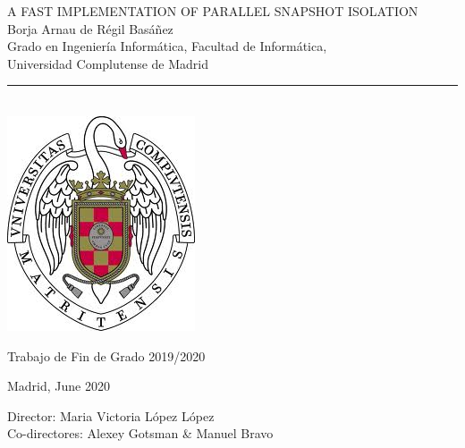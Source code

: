 \newpage
\thispagestyle{empty}
\begin{center}
   \vspace{1cm}
   {\Large A FAST IMPLEMENTATION OF PARALLEL SNAPSHOT ISOLATION}\\
   \vspace{0.5cm}
   \vspace{0.5cm}
   {\large Borja Arnau de Régil Basáñez}\\
   \vspace{0.5cm}
   Grado en Ingeniería Informática, Facultad de Informática,\\
   Universidad Complutense de Madrid \\
   \vspace{0.65cm}
   \rule{2in}{0.5pt}\\
   \vspace{0.85cm}
   \includegraphics[height=2.5in]{figures/escudo.jpg}

   \vspace{0.5cm}
   Trabajo de Fin de Grado 2019/2020
   \vspace{0.5cm}

     Madrid, June 2020\\
   \vspace{1cm}
\end{center}

{\raggedleft
   \vspace{1cm}
   Director: Maria Victoria López López\\
   Co-directores: Alexey Gotsman \& Manuel Bravo\\
}
